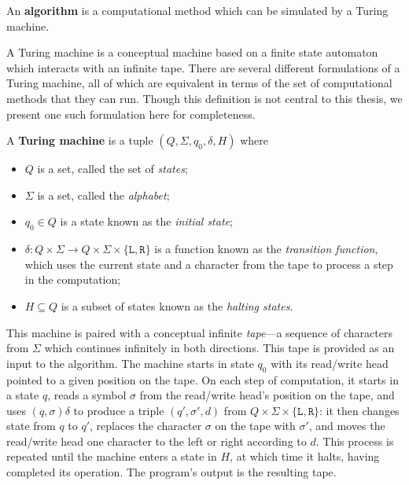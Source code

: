\begin{definition}
  \label{def:algorithm}
  An \textbf{algorithm} is a computational method which can be simulated by a
  Turing machine.
\end{definition}

A Turing machine is a conceptual machine based on a finite state automaton which
interacts with an infinite tape.  There are several different formulations of a
Turing machine, all of which are equivalent in terms of the set of computational
methods that they can run.  Though this definition is not central to this
thesis, we present one such formulation here for completeness.

\begin{definition}
  \label{def:turing-machine}
  A \textbf{Turing machine} is a tuple $(Q, \Sigma, q_0, \delta, H)$ where
  \begin{itemize}
  \item $Q$ is a set, called the set of \textit{states};
  \item $\Sigma$ is a set, called the \textit{alphabet};
  \item $q_0 \in Q$ is a state known as the \textit{initial state};
  \item $\delta: Q \times \Sigma \to
    Q \times \Sigma \times \{\mathtt{L}, \mathtt{R}\}$
    is a function known as the \textit{transition function}, which uses the
    current state and a character from the tape to process a step in the
    computation;
  \item $H \subseteq Q$ is a subset of states known as the \textit{halting
      states}.
  \end{itemize}
  This machine is paired with a conceptual infinite \textit{tape}---a
  sequence of characters from $\Sigma$ which continues infinitely in both
  directions.  This tape is provided as an input to the algorithm.  The machine
  starts in state $q_0$ with its read/write head pointed to a given position on
  the tape.  On each step of computation, it starts in a state $q$, reads a
  symbol $\sigma$ from the read/write head's position on the tape, and uses
  $(q, \sigma)\delta$ to produce a triple $(q', \sigma', d)$ from
  $Q \times \Sigma \times \{\mathtt{L},\mathtt{R}\}$:
  it then changes state from $q$ to $q'$,
  replaces the character $\sigma$ on the tape with $\sigma'$, and moves the
  read/write head one character to the left or right according to $d$.  This process is
  repeated until the machine enters a state in $H$, at which time it halts,
  having completed its operation.  The program's output is the resulting tape.
\end{definition}

